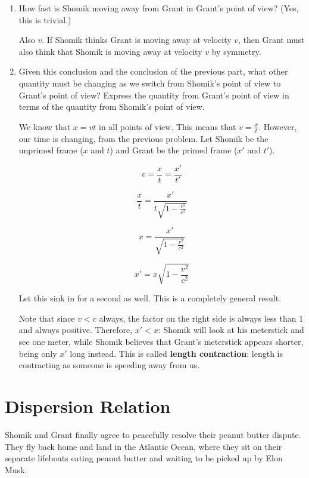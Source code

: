 \documentclass{article}
\begin{document}
\begin{enumerate}[label=(\alph*)]
    \item How fast is Shomik moving away from Grant in Grant's point of view? (Yes, this is trivial.)

    Also $\boxed{v}$. If Shomik thinks Grant is moving away at velocity $v$, then Grant must also think that Shomik is moving away at velocity $v$ by symmetry.
    
    \item Given this conclusion and the conclusion of the previous part, what other quantity must be changing as we switch from Shomik's point of view to Grant's point of view? Express the quantity from Grant's point of view in terms of the quantity from Shomik's point of view.

    We know that $x = vt$ in all points of view. This means that $v = \frac{x}{t}$. However, our time is changing, from the previous problem. Let Shomik be the unprimed frame ($x$ and $t$) and Grant be the primed frame ($x'$ and $t'$).

    $$v = \frac{x}{t} = \frac{x'}{t'}$$

    $$\frac{x}{t} = \frac{x'}{t\sqrt{1 - \frac{v^2}{c^2}}}$$

    $$x = \frac{x'}{\sqrt{1 - \frac{v^2}{c^2}}}$$

    $$\boxed{x' = x\sqrt{1 - \frac{v^2}{c^2}}}$$

    Let this sink in for a second as well. This is a completely general result.

    Note that since $v < c$ always, the factor on the right side is always less than $1$ and always positive. Therefore, $x' < x$: Shomik will look at his meterstick and see one meter, while Shomik believes that Grant's meterstick appears shorter, being only $x'$ long instead. This is called \textbf{length contraction}: length is contracting as someone is speeding away from us.
\end{enumerate}

\newpage

\section{Dispersion Relation}

Shomik and Grant finally agree to peacefully resolve their peanut butter dispute. They fly back home and land in the Atlantic Ocean, where they sit on their separate lifeboats eating peanut butter and waiting to be picked up by Elon Musk.
\end{document}
